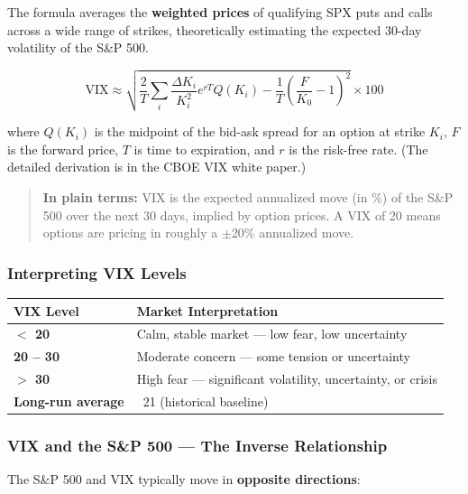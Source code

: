 \documentclass[12pt,openany]{book}
\begin{document}
The formula averages the \textbf{weighted prices} of qualifying SPX puts and calls across a wide range of strikes, theoretically estimating the expected 30-day volatility of the S\&P 500.

\[
\text{VIX} \approx \sqrt{\frac{2}{T} \sum_i \frac{\Delta K_i}{K_i^2} e^{rT} Q(K_i) - \frac{1}{T}\left(\frac{F}{K_0} - 1\right)^2} \times 100
\]

where \(Q(K_i)\) is the midpoint of the bid-ask spread for an option at strike \(K_i\), \(F\) is the forward price, \(T\) is time to expiration, and \(r\) is the risk-free rate. (The detailed derivation is in the CBOE VIX white paper.)

\begin{quote}
\textbf{In plain terms:} VIX is the expected annualized move (in \%) of the S\&P 500 over the next 30 days, implied by option prices. A VIX of 20 means options are pricing in roughly a \(\pm\)20\% annualized move.
\end{quote}

\subsubsection{Interpreting VIX Levels}

\begin{center}
\scriptsize
\setlength{\tabcolsep}{3pt}
\begin{tabular}{|L{6.3cm}|L{6.3cm}|}
\hline
\textbf{VIX Level} & \textbf{Market Interpretation} \\
\hline
\textbf{\(<\) 20} & Calm, stable market — low fear, low uncertainty \\
\hline
\textbf{20 – 30} & Moderate concern — some tension or uncertainty \\
\hline
\textbf{\(>\) 30} & High fear — significant volatility, uncertainty, or crisis \\
\hline
\textbf{Long-run average} & ~21 (historical baseline) \\
\hline
\end{tabular}
\end{center}

\subsubsection{VIX and the S\&P 500 — The Inverse Relationship}

The S\&P 500 and VIX typically move in \textbf{opposite directions}:
\end{document}
